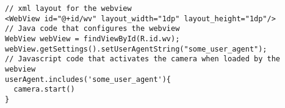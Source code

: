 \documentclass[sigconf,balance=false]{acmart}
\begin{document}
\vspace{0.3cm}
\hspace{-0.1\linewidth}
\begin{lstlisting}[basicstyle=\small\ttfamily,caption={Code snippet that demonstrates how Spy24 streams live videos},label={lst:invisible_browser_code},captionpos=b,float=t]
// xml layout for the webview
<WebView id="@+id/wv" layout_width="1dp" layout_height="1dp"/>
// Java code that configures the webview
WebView webView = findViewById(R.id.wv);
webView.getSettings().setUserAgentString("some_user_agent");
// Javascript code that activates the camera when loaded by the webview
userAgent.includes('some_user_agent'){
  camera.start()
}
\end{lstlisting}




\end{document}
